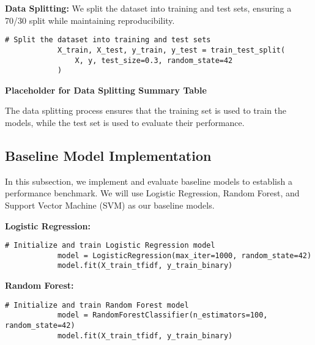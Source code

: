         \textbf{Data Splitting:} We split the dataset into training and test sets, ensuring a 70/30 split while maintaining reproducibility.

        \begin{lstlisting}[caption={Split the dataset into training and test sets}, label={lst:split_dataset}]
            # Split the dataset into training and test sets
            X_train, X_test, y_train, y_test = train_test_split(
                X, y, test_size=0.3, random_state=42
            )
        \end{lstlisting}
        
        \vspace{1em}

        \textbf{Placeholder for Data Splitting Summary Table}

        The data splitting process ensures that the training set is used to train the models, while the test set is used to evaluate their performance.
            
    \subsection{Baseline Model Implementation}
    
        In this subsection, we implement and evaluate baseline models to establish a performance benchmark. We will use Logistic Regression, Random Forest, and Support Vector Machine (SVM) as our baseline models.

        \textbf{Logistic Regression:}

        \begin{lstlisting}[caption={Train Logistic Regression model}, label={lst:logistic_regression}]
            # Initialize and train Logistic Regression model
            model = LogisticRegression(max_iter=1000, random_state=42)
            model.fit(X_train_tfidf, y_train_binary)
        \end{lstlisting}
        
        \vspace{1em}

        \textbf{Random Forest:}

        \begin{lstlisting}[caption={Train Random Forest model}, label={lst:random_forest}]
            # Initialize and train Random Forest model
            model = RandomForestClassifier(n_estimators=100, random_state=42)
            model.fit(X_train_tfidf, y_train_binary)
        \end{lstlisting}
        

